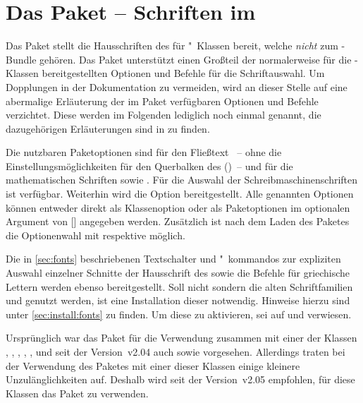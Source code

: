 \section{Das Paket  -- Schriften im \CD}
\begin{Bundle*}{}
%
Das Paket  stellt die Hausschriften des \TUDCDs für 
"~Klassen bereit, welche \emph{nicht} zum \TUDScript-Bundle 
gehören. Das Paket unterstützt einen Großteil der normalerweise für die 
\TUDScript-Klassen bereitgestellten Optionen und Befehle für die 
Schriftauswahl. Um Dopplungen in der Dokumentation zu vermeiden, wird an dieser 
Stelle auf eine abermalige Erläuterung der im Paket  
verfügbaren Optionen und Befehle verzichtet. Diese werden im Folgenden 
lediglich noch einmal genannt, die dazugehörigen Erläuterungen sind in 
 zu finden.

Die nutzbaren Paketoptionen sind für den Fließtext ~-- ohne die 
Einstellungsmöglichkeiten für den Querbalken des \CDs ()~-- und 
für die mathematischen Schriften  sowie . 
Für die Auswahl der Schreibmaschinenschriften ist  verfügbar. 
Weiterhin wird die Option  bereitgestellt. Alle genannten 
Optionen können entweder direkt als Klassenoption oder als Paketoptionen im 
optionalen Argument von 
[] 
angegeben werden. Zusätzlich ist nach dem Laden des Paketes die Optionenwahl 
mit  respektive  möglich.

Die in \autoref{sec:fonts} beschriebenen Textschalter und "~kommandos zur 
expliziten Auswahl einzelner Schnitte der Hausschrift des \CDs sowie die 
Befehle für griechische Lettern werden ebenso bereitgestellt.
Soll nicht \OpenSans sondern die alten Schriftfamilien \Univers und \DIN 
genutzt werden, ist eine Installation dieser notwendig. Hinweise hierzu sind 
unter \autoref{sec:install:fonts} zu finden. Um diese zu aktivieren, sei auf 
 und  verwiesen.

Ursprünglich war das Paket  für die Verwendung zusammen 
mit einer der Klassen , , , 
, ,  und seit der Version~v2.04 
auch  sowie  vorgesehen. Allerdings 
traten bei der Verwendung des Paketes mit einer dieser Klassen einige kleinere 
Unzulänglichkeiten auf. Deshalb wird seit der Version~v2.05 empfohlen, für 
diese Klassen das Paket  zu verwenden.
\end{Bundle*}



